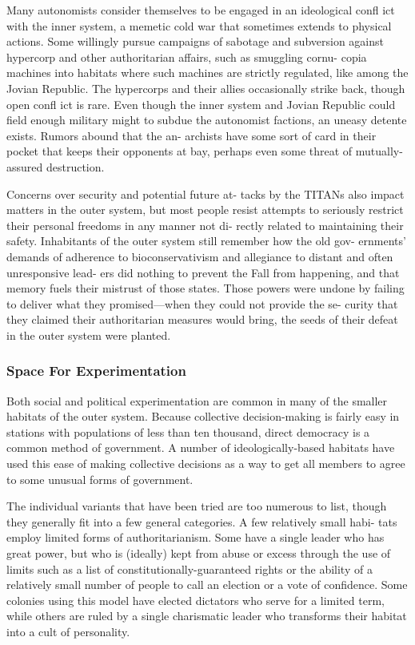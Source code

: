 Many autonomists consider themselves to be 
engaged in an ideological confl ict with the inner 
system, a memetic cold war that sometimes extends 
to physical actions. Some willingly pursue campaigns 
of sabotage and subversion against hypercorp and 
other authoritarian affairs, such as smuggling cornu-
copia machines into habitats where such machines 
are strictly regulated, like among the Jovian Republic. 
The hypercorps and their allies occasionally strike 
back, though open confl ict is rare. Even though the 
inner system and Jovian Republic could field enough 
military might to subdue the autonomist factions, an 
uneasy detente exists. Rumors abound that the an-
archists have some sort of card in their pocket that 
keeps their opponents at bay, perhaps even some 
threat of mutually-assured destruction.

Concerns over security and potential future at-
tacks by the TITANs also impact matters in the outer 
system, but most people resist attempts to seriously 
restrict their personal freedoms in any manner not di-
rectly related to maintaining their safety. Inhabitants 
of the outer system still remember how the old gov-
ernments' demands of adherence to bioconservativism 
and allegiance to distant and often unresponsive lead-
ers did nothing to prevent the Fall from happening, 
and that memory fuels their mistrust of those states. 
Those powers were undone by failing to deliver what 
they promised—when they could not provide the se-
curity that they claimed their authoritarian measures 
would bring, the seeds of their defeat in the outer 
system were planted.

\subsubsection{Space For Experimentation}

Both social and political experimentation are common 
in many of the smaller habitats of the outer system. 
Because collective decision-making is fairly easy in 
stations with populations of less than ten thousand, 
direct democracy is a common method of government. 
A number of ideologically-based habitats have used 
this ease of making collective decisions as a way to 
get all members to agree to some unusual forms of 
government.

The individual variants that have been tried are 
too numerous to list, though they generally fit into 
a few general categories. A few relatively small habi-
tats employ limited forms of authoritarianism. Some 
have a single leader who has great power, but who is 
(ideally) kept from abuse or excess through the use 
of limits such as a list of constitutionally-guaranteed 
rights or the ability of a relatively small number of 
people to call an election or a vote of confidence. 
Some colonies using this model have elected dictators 
who serve for a limited term, while others are ruled 
by a single charismatic leader who transforms their 
habitat into a cult of personality.


